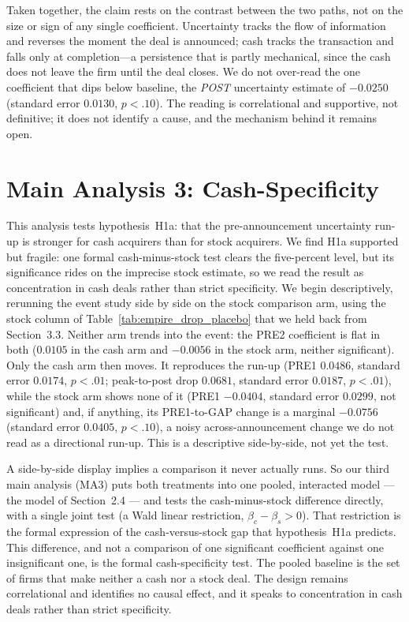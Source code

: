 Taken together, the claim rests on the contrast between the two paths, not on the size or sign of any single coefficient. Uncertainty tracks the flow of information and reverses the moment the deal is announced; cash tracks the transaction and falls only at completion---a persistence that is partly mechanical, since the cash does not leave the firm until the deal closes. We do not over-read the one coefficient that dips below baseline, the \textit{POST} uncertainty estimate of $-0.0250$ (standard error $0.0130$, $p<.10$). The reading is correlational and supportive, not definitive; it does not identify a cause, and the mechanism behind it remains open.

\section{Main Analysis 3: Cash-Specificity}

This analysis tests hypothesis~H1a: that the pre-announcement uncertainty run-up is stronger for cash acquirers than for stock acquirers. We find H1a supported but fragile: one formal cash-minus-stock test clears the five-percent level, but its significance rides on the imprecise stock estimate, so we read the result as concentration in cash deals rather than strict specificity. We begin descriptively, rerunning the event study side by side on the stock comparison arm, using the stock column of Table~\ref{tab:empire_drop_placebo} that we held back from Section~3.3. Neither arm trends into the event: the PRE2 coefficient is flat in both ($0.0105$ in the cash arm and $-0.0056$ in the stock arm, neither significant). Only the cash arm then moves. It reproduces the run-up (PRE1 $0.0486$, standard error $0.0174$, $p<.01$; peak-to-post drop $0.0681$, standard error $0.0187$, $p<.01$), while the stock arm shows none of it (PRE1 $-0.0404$, standard error $0.0299$, not significant) and, if anything, its PRE1-to-GAP change is a marginal $-0.0756$ (standard error $0.0405$, $p<.10$), a noisy across-announcement change we do not read as a directional run-up. This is a descriptive side-by-side, not yet the test.

A side-by-side display implies a comparison it never actually runs. So our third main analysis (MA3) puts both treatments into one pooled, interacted model --- the model of Section~2.4 --- and tests the cash-minus-stock difference directly, with a single joint test (a Wald linear restriction, $\beta_c-\beta_s>0$). That restriction is the formal expression of the cash-versus-stock gap that hypothesis~H1a predicts. This difference, and not a comparison of one significant coefficient against one insignificant one, is the formal cash-specificity test. The pooled baseline is the set of firms that make neither a cash nor a stock deal. The design remains correlational and identifies no causal effect, and it speaks to concentration in cash deals rather than strict specificity.

